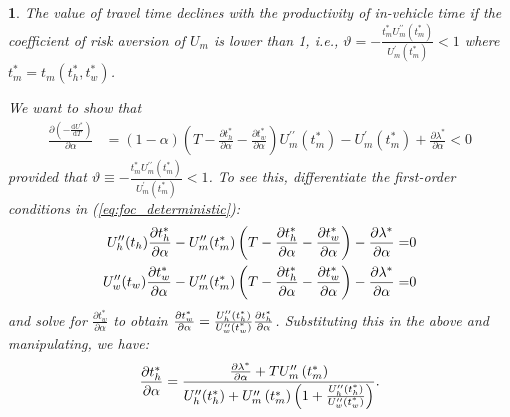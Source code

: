 \documentclass[12pt,a4paper,british]{article}
\makeatletter
\theoremstyle{definition}
\theoremstyle{plain}
\newenvironment{proof}[1][\proofname]{\par
    \normalfont\topsep6\p@\@plus6\p@\relax
    \trivlist
    \itemindent\parindent
    \item[\hskip\labelsep
          \scshape
      #1]\ignorespaces
  }{%
    \endtrivlist\@endpefalse
  }
\providecommand{\proofname}{Proof}
\theoremstyle{plain}
\newtheorem{prop}{\protect\propositionname}
\providecommand{\propositionname}{Proposition}
\makeatother
\begin{document}
\begin{prop}
The value of travel time declines with the productivity of in-vehicle
time if the coefficient of risk aversion of $U_{m}$ is lower than
1, i.e., $\vartheta=-\frac{t_{m}^{\ast}U_{m}^{\prime\prime}\left(t_{m}^{\ast}\right)}{U_{m}^{\prime}\left(t_{m}^{\ast}\right)}<1$
where $t_{m}^{\ast}=t_{m}\left(t_{h}^{\ast},t_{w}^{\ast}\right)$.
\begin{proof}
We want to show that
\begin{align*}
\frac{\partial\left(-\frac{\mathrm{d}U^{\ast}}{\mathrm{d}T}\right)}{\partial\alpha} & =\left(1-\alpha\right)\left(T-\frac{\partial t_{h}^{\ast}}{\partial\alpha}-\frac{\partial t_{w}^{\ast}}{\partial\alpha}\right)U_{m}^{\prime\prime}\left(t_{m}^{\ast}\right)-U_{m}^{\prime}\left(t_{m}^{\ast}\right)+\frac{\partial\lambda^{\ast}}{\partial\alpha}<0
\end{align*}
provided that $\vartheta\equiv-\frac{t_{m}^{\ast}U_{m}^{\prime\prime}\left(t_{m}^{\ast}\right)}{U_{m}^{\prime}\left(t_{m}^{\ast}\right)}<1$.
To see this, differentiate the first-order conditions in (\ref{eq:foc_deterministic}):
\begin{align*}
U_{h}^{\prime\prime}\text{\ensuremath{\left(t_{h}\right)}}\frac{\partial t_{h}^{\ast}}{\partial\alpha}-U_{m}^{\prime\prime}\text{\ensuremath{\left(t_{m}^{\ast}\right)}}\left(T-\frac{\partial t_{h}^{\ast}}{\partial\alpha}-\frac{\partial t_{w}^{\ast}}{\partial\alpha}\right)-\frac{\partial\lambda^{\ast}}{\partial\alpha}= & 0\\
U_{w}^{\prime\prime}\text{\ensuremath{\left(t_{w}\right)}}\frac{\partial t_{w}^{\ast}}{\partial\alpha}-U_{m}^{\prime\prime}\text{\ensuremath{\left(t_{m}^{\ast}\right)}}\left(T-\frac{\partial t_{h}^{\ast}}{\partial\alpha}-\frac{\partial t_{w}^{\ast}}{\partial\alpha}\right)-\frac{\partial\lambda^{\ast}}{\partial\alpha}= & 0
\end{align*}
and solve for $\frac{\partial t_{w}^{\ast}}{\partial\alpha}$ to obtain
$\frac{\partial t_{w}^{\ast}}{\partial\alpha}=\frac{U_{h}^{\prime\prime}\text{\ensuremath{\left(t_{h}^{\ast}\right)}}}{U_{w}^{\prime\prime}\text{\ensuremath{\left(t_{w}^{\ast}\right)}}}\frac{\partial t_{h}^{\ast}}{\text{\ensuremath{\partial\alpha}}}$.
Substituting this in the above and manipulating, we have: 
\[
\frac{\partial t_{h}^{\ast}}{\partial\alpha}=\frac{\frac{\partial\lambda^{\ast}}{\partial\alpha}+TU_{m}^{\prime\prime}\left(t_{m}^{\ast}\right)}{U_{h}^{\prime\prime}\text{\ensuremath{\left(t_{h}^{\ast}\right)}}+U_{m}^{\prime\prime}\left(t_{m}^{\ast}\right)\left(1+\frac{U_{h}^{\prime\prime}\text{\ensuremath{\left(t_{h}^{\ast}\right)}}}{U_{w}^{\prime\prime}\text{\ensuremath{\left(t_{w}^{\ast}\right)}}}\right)}.
\]
\end{proof}
\end{prop}
\end{document}
